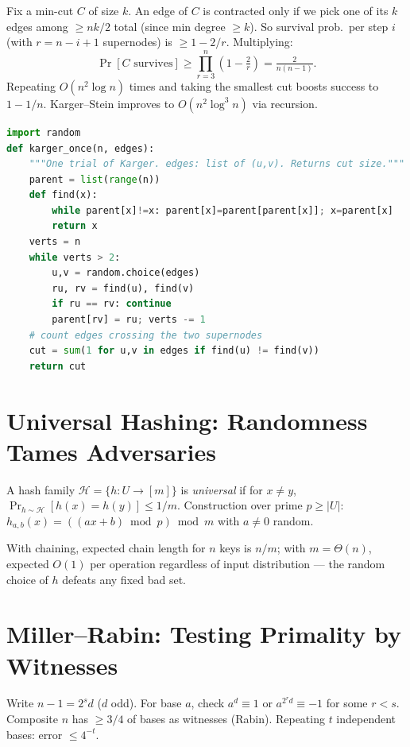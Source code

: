 Fix a min-cut $C$ of size $k$. An edge of $C$ is contracted only if we pick one of its $k$ edges among $\ge nk/2$ total (since min degree $\ge k$). So survival prob.\ per step $i$ (with $r=n-i+1$ supernodes) is $\ge1-2/r$. Multiplying:
\[
\Pr[\text{$C$ survives}] \ge \prod_{r=3}^{n}\!\left(1-\tfrac{2}{r}\right)=\tfrac{2}{n(n-1)}.
\]
Repeating $O(n^2\log n)$ times and taking the smallest cut boosts success to $1-1/n$. Karger--Stein improves to $O(n^2\log^3 n)$ via recursion.

\begin{lstlisting}[language=Python]
import random
def karger_once(n, edges):
    """One trial of Karger. edges: list of (u,v). Returns cut size."""
    parent = list(range(n))
    def find(x):
        while parent[x]!=x: parent[x]=parent[parent[x]]; x=parent[x]
        return x
    verts = n
    while verts > 2:
        u,v = random.choice(edges)
        ru, rv = find(u), find(v)
        if ru == rv: continue
        parent[rv] = ru; verts -= 1
    # count edges crossing the two supernodes
    cut = sum(1 for u,v in edges if find(u) != find(v))
    return cut
\end{lstlisting}

\section{Universal Hashing: Randomness Tames Adversaries}
\label{sec:hashing}

A hash family $\mathcal{H}=\{h:U\to[m]\}$ is \emph{universal} if for $x\neq y$, $\Pr_{h\sim\mathcal{H}}[h(x)=h(y)]\le1/m$. Construction over prime $p\ge|U|$: $h_{a,b}(x)=((ax+b)\bmod p)\bmod m$ with $a\neq0$ random.

With chaining, expected chain length for $n$ keys is $n/m$; with $m=\Theta(n)$, expected $O(1)$ per operation regardless of input distribution --- the random choice of $h$ defeats any fixed bad set.

\section{Miller--Rabin: Testing Primality by Witnesses}
\label{sec:miller-rabin}

Write $n-1=2^s d$ ($d$ odd). For base $a$, check $a^d\equiv1$ or $a^{2^rd}\equiv-1$ for some $r<s$. Composite $n$ has $\ge3/4$ of bases as witnesses (Rabin). Repeating $t$ independent bases: error $\le4^{-t}$.

